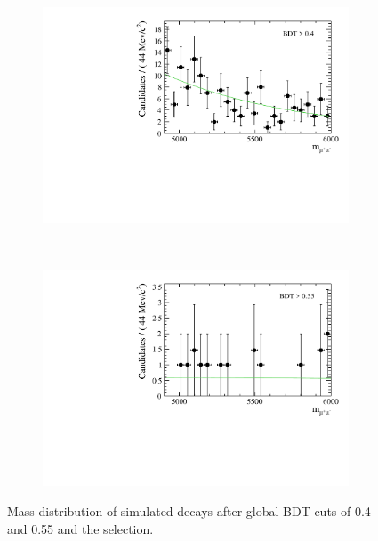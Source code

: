 {\begin{figure}[htbp]
    \centering
    \begin{subfigure}[b]{0.7\textwidth}
        \includegraphics[width=\textwidth]{./Figs/Selection/BDT0p4.pdf}
        \caption{ }
        \label{fig:BDT0p4}
    \end{subfigure}
    ~ %
    \begin{subfigure}[b]{0.7\textwidth}
       \includegraphics[width=\textwidth]{./Figs/Selection/BDT0p55.pdf}
        \caption{ }
        \label{fig:BDT0p5}
    \end{subfigure}
    \caption{Mass distribution of \bbarmumux simulated decays after global BDT cuts of 0.4 and 0.55 and the \bsmumu selection.}
    \label{fig:BDTmasses}
\end{figure}



}
